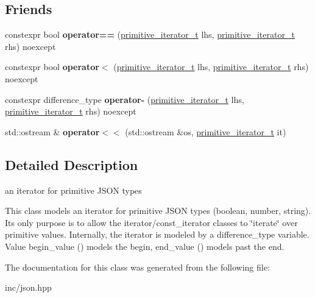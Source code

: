 \subsection*{Friends}
\begin{DoxyCompactItemize}
\item 
constexpr bool {\bfseries operator==} (\hyperlink{classnlohmann_1_1detail_1_1primitive__iterator__t}{primitive\+\_\+iterator\+\_\+t} lhs, \hyperlink{classnlohmann_1_1detail_1_1primitive__iterator__t}{primitive\+\_\+iterator\+\_\+t} rhs) noexcept\hypertarget{classnlohmann_1_1detail_1_1primitive__iterator__t_aae1e1e2ec0e229d1291d69de57d76bbe}{}\label{classnlohmann_1_1detail_1_1primitive__iterator__t_aae1e1e2ec0e229d1291d69de57d76bbe}

\item 
constexpr bool {\bfseries operator$<$} (\hyperlink{classnlohmann_1_1detail_1_1primitive__iterator__t}{primitive\+\_\+iterator\+\_\+t} lhs, \hyperlink{classnlohmann_1_1detail_1_1primitive__iterator__t}{primitive\+\_\+iterator\+\_\+t} rhs) noexcept\hypertarget{classnlohmann_1_1detail_1_1primitive__iterator__t_a901a95e6d73c9509d3dcde914f6c8a9d}{}\label{classnlohmann_1_1detail_1_1primitive__iterator__t_a901a95e6d73c9509d3dcde914f6c8a9d}

\item 
constexpr difference\+\_\+type {\bfseries operator-\/} (\hyperlink{classnlohmann_1_1detail_1_1primitive__iterator__t}{primitive\+\_\+iterator\+\_\+t} lhs, \hyperlink{classnlohmann_1_1detail_1_1primitive__iterator__t}{primitive\+\_\+iterator\+\_\+t} rhs) noexcept\hypertarget{classnlohmann_1_1detail_1_1primitive__iterator__t_ac6d902d6ec9a02dabed5452d3ae78f7e}{}\label{classnlohmann_1_1detail_1_1primitive__iterator__t_ac6d902d6ec9a02dabed5452d3ae78f7e}

\item 
std\+::ostream \& {\bfseries operator$<$$<$} (std\+::ostream \&os, \hyperlink{classnlohmann_1_1detail_1_1primitive__iterator__t}{primitive\+\_\+iterator\+\_\+t} it)\hypertarget{classnlohmann_1_1detail_1_1primitive__iterator__t_a653e8be3b4fb047e8b4460cd932f2b52}{}\label{classnlohmann_1_1detail_1_1primitive__iterator__t_a653e8be3b4fb047e8b4460cd932f2b52}

\end{DoxyCompactItemize}


\subsection{Detailed Description}
an iterator for primitive J\+S\+ON types 

This class models an iterator for primitive J\+S\+ON types (boolean, number, string). It\textquotesingle{}s only purpose is to allow the iterator/const\+\_\+iterator classes to \char`\"{}iterate\char`\"{} over primitive values. Internally, the iterator is modeled by a {\ttfamily difference\+\_\+type} variable. Value begin\+\_\+value ({}) models the begin, end\+\_\+value ({}) models past the end. 

The documentation for this class was generated from the following file\+:\begin{DoxyCompactItemize}
\item 
inc/json.\+hpp\end{DoxyCompactItemize}
